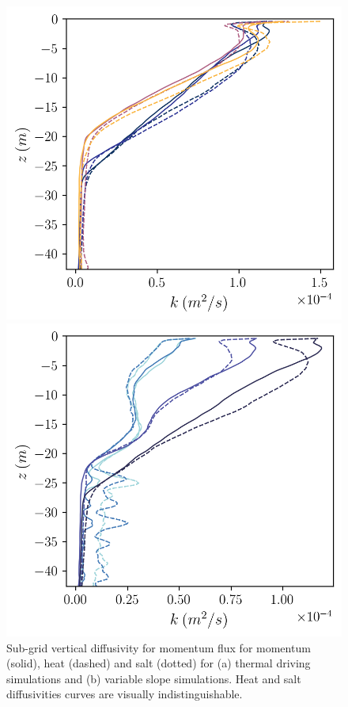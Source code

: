 \documentclass[draft,jgrga]{agutexSI2019}
\begin{document}
\begin{figure}[]
    \centering
    \begin{minipage}{0.5\textwidth}
        \includegraphics[trim={0 10cm 0 0},clip, width=\textwidth]{Figures/k_cmp_dT_43h_tav13h_z_profile.png}
    \end{minipage}%
    \begin{minipage}{0.5\textwidth}
        \includegraphics[trim={0 10cm 0 0},clip, width=\textwidth]{Figures/k_cmp_dslope_43h_tav13h_z_profile.png}
    \end{minipage}
    \caption{Sub-grid vertical diffusivity for momentum flux for momentum (solid), heat (dashed) and salt (dotted) for (a) thermal driving simulations and (b) variable slope simulations. Heat and salt diffusivities curves are visually indistinguishable.}
    \label{fig:k_all}
\end{figure}
\end{document}
